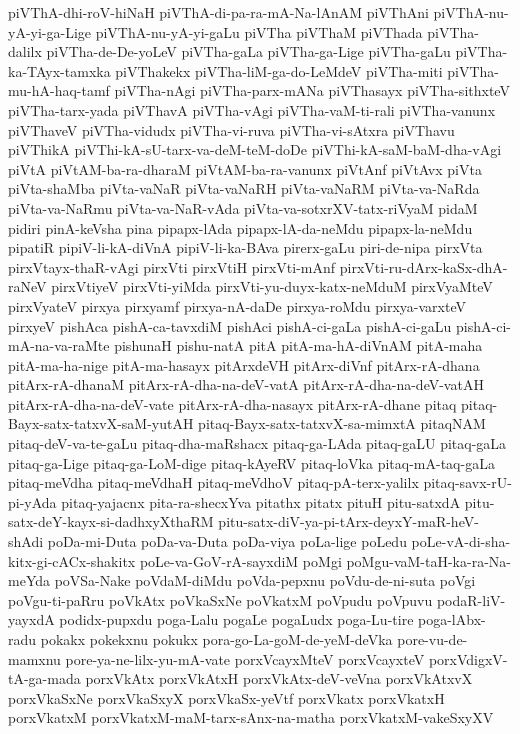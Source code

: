 {piVThA-dhi-roV-hiNaH
piVThA-di-pa-ra-mA-Na-lAnAM
piVThAni
piVThA-nu-yA-yi-ga-Lige
piVThA-nu-yA-yi-gaLu
piVTha
piVThaM
piVThada
piVTha-dalilx
piVTha-de-De-yoLeV
piVTha-gaLa
piVTha-ga-Lige
piVTha-gaLu
piVTha-ka-TAyx-tamxka
piVThakekx
piVTha-liM-ga-do-LeMdeV
piVTha-miti
piVTha-mu-hA-haq-tamf
piVTha-nAgi
piVTha-parx-mANa
piVThasayx
piVTha-sithxteV
piVTha-tarx-yada
piVThavA
piVTha-vAgi
piVTha-vaM-ti-rali
piVTha-vanunx
piVThaveV
piVTha-vidudx
piVTha-vi-ruva
piVTha-vi-sAtxra
piVThavu
piVThikA
piVThi-kA-sU-tarx-va-deM-teM-doDe
piVThi-kA-saM-baM-dha-vAgi
piVtA
piVtAM-ba-ra-dharaM
piVtAM-ba-ra-vanunx
piVtAnf
piVtAvx
piVta
piVta-shaMba
piVta-vaNaR
piVta-vaNaRH
piVta-vaNaRM
piVta-va-NaRda
piVta-va-NaRmu
piVta-va-NaR-vAda
piVta-va-sotxrXV-tatx-riVyaM
pidaM
pidiri
pinA-keVsha
pina
pipapx-lAda
pipapx-lA-da-neMdu
pipapx-la-neMdu
pipatiR
pipiV-li-kA-diVnA
pipiV-li-ka-BAva
pirerx-gaLu
piri-de-nipa
pirxVta
pirxVtayx-thaR-vAgi
pirxVti
pirxVtiH
pirxVti-mAnf
pirxVti-ru-dArx-kaSx-dhA-raNeV
pirxVtiyeV
pirxVti-yiMda
pirxVti-yu-duyx-katx-neMduM
pirxVyaMteV
pirxVyateV
pirxya
pirxyamf
pirxya-nA-daDe
pirxya-roMdu
pirxya-varxteV
pirxyeV
pishAca
pishA-ca-tavxdiM
pishAci
pishA-ci-gaLa
pishA-ci-gaLu
pishA-ci-mA-na-va-raMte
pishunaH
pishu-natA
pitA
pitA-ma-hA-diVnAM
pitA-maha
pitA-ma-ha-nige
pitA-ma-hasayx
pitArxdeVH
pitArx-diVnf
pitArx-rA-dhana
pitArx-rA-dhanaM
pitArx-rA-dha-na-deV-vatA
pitArx-rA-dha-na-deV-vatAH
pitArx-rA-dha-na-deV-vate
pitArx-rA-dha-nasayx
pitArx-rA-dhane
pitaq
pitaq-Bayx-satx-tatxvX-saM-yutAH
pitaq-Bayx-satx-tatxvX-sa-mimxtA
pitaqNAM
pitaq-deV-va-te-gaLu
pitaq-dha-maRshacx
pitaq-ga-LAda
pitaq-gaLU
pitaq-gaLa
pitaq-ga-Lige
pitaq-ga-LoM-dige
pitaq-kAyeRV
pitaq-loVka
pitaq-mA-taq-gaLa
pitaq-meVdha
pitaq-meVdhaH
pitaq-meVdhoV
pitaq-pA-terx-yalilx
pitaq-savx-rU-pi-yAda
pitaq-yajacnx
pita-ra-shecxYva
pitathx
pitatx
pituH
pitu-satxdA
pitu-satx-deY-kayx-si-dadhxyXthaRM
pitu-satx-diV-ya-pi-tArx-deyxY-maR-heV-shAdi
poDa-mi-Duta
poDa-va-Duta
poDa-viya
poLa-lige
poLedu
poLe-vA-di-sha-kitx-gi-cACx-shakitx
poLe-va-GoV-rA-sayxdiM
poMgi
poMgu-vaM-taH-ka-ra-Na-meYda
poVSa-Nake
poVdaM-diMdu
poVda-pepxnu
poVdu-de-ni-suta
poVgi
poVgu-ti-paRru
poVkAtx
poVkaSxNe
poVkatxM
poVpudu
poVpuvu
podaR-liV-yayxdA
podidx-pupxdu
poga-Lalu
pogaLe
pogaLudx
poga-Lu-tire
poga-lAbx-radu
pokakx
pokekxnu
pokukx
pora-go-La-goM-de-yeM-deVka
pore-vu-de-mamxnu
pore-ya-ne-lilx-yu-mA-vate
porxVcayxMteV
porxVcayxteV
porxVdigxV-tA-ga-mada
porxVkAtx
porxVkAtxH
porxVkAtx-deV-veVna
porxVkAtxvX
porxVkaSxNe
porxVkaSxyX
porxVkaSx-yeVtf
porxVkatx
porxVkatxH
porxVkatxM
porxVkatxM-maM-tarx-sAnx-na-matha
porxVkatxM-vakeSxyXV
}
